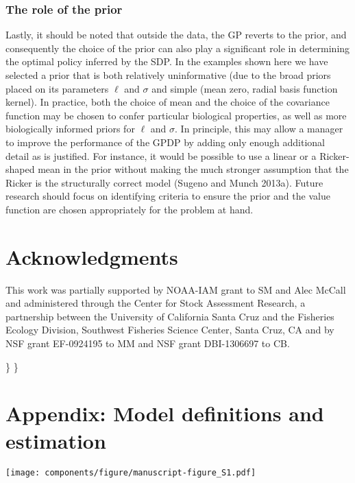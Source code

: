 \documentclass[]{components/elsarticle}
\begin{document}
\subsubsection{The role of the prior}\label{the-role-of-the-prior}

Lastly, it should be noted that outside the data, the GP reverts to the
prior, and consequently the choice of the prior can also play a
significant role in determining the optimal policy inferred by the SDP.
In the examples shown here we have selected a prior that is both
relatively uninformative (due to the broad priors placed on its
parameters $\ell$ and $\sigma$ and simple (mean zero, radial basis
function kernel). In practice, both the choice of mean and the choice of
the covariance function may be chosen to confer particular biological
properties, as well as more biologically informed priors for $\ell$ and
$\sigma$. In principle, this may allow a manager to improve the
performance of the GPDP by adding only enough additional detail as is
justified. For instance, it would be possible to use a linear or a
Ricker-shaped mean in the prior without making the much stronger
assumption that the Ricker is the structurally correct model (Sugeno and
Munch 2013a). Future research should focus on identifying criteria to
ensure the prior and the value function are chosen appropriately for the
problem at hand.

\section{Acknowledgments}\label{acknowledgments}

This work was partially supported by NOAA-IAM grant to SM and Alec
McCall and administered through the Center for Stock Assessment
Research, a partnership between the University of California Santa Cruz
and the Fisheries Ecology Division, Southwest Fisheries Science Center,
Santa Cruz, CA and by NSF grant EF-0924195 to MM and NSF grant
DBI-1306697 to CB.

\appendix
\renewcommand*{\thefigure}{S\arabic{figure}}
\renewcommand*{\thetable}{S\arabic{table}} \setcounter{figure}{0}\}
\setcounter{table}{0}\}

\section{Appendix: Model definitions and
estimation}\label{appendix-model-definitions-and-estimation}

\texttt{[image: components/figure/manuscript-figure\_S1.pdf]}
\end{document}
